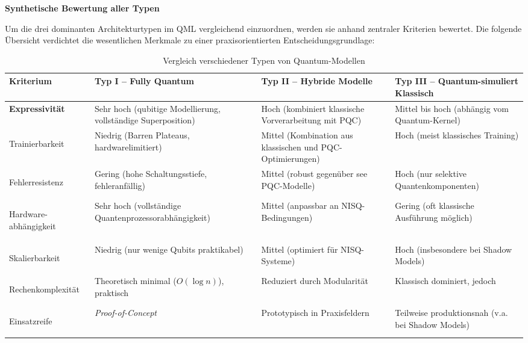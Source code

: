 \vspace{1.5em}
\noindent\textbf{Synthetische Bewertung aller Typen}

\noindent
Um die drei dominanten Architekturtypen im QML vergleichend einzuordnen, werden sie anhand zentraler Kriterien bewertet. Die folgende Übersicht verdichtet die wesentlichen Merkmale zu einer praxisorientierten Entscheidungsgrundlage:


\begin{table}[ht]
\centering
\small
\begin{tabular}{|>{\bfseries}m{2.5cm}|m{3cm}|m{3cm}|m{3cm}|}
\hline
Kriterium & Typ I – \textbf{Fully Quantum} & Typ II – \textbf{Hybride Modelle} & Typ III – \textbf{Quantum-simuliert Klassisch} \\
\hline

Expressivität & Sehr hoch (qubitige Modellierung, vollständige Superposition) & Hoch (kombiniert klassische Vorverarbeitung mit PQC) & Mittel bis hoch (abhängig vom Quantum-Kernel) \\
\hline

Trainierbarkeit & Niedrig (Barren Plateaus, hardwarelimitiert) & Mittel (Kombination aus klassischen und PQC-Optimierungen) & Hoch (meist klassisches Training) \\
\hline

Fehlerresistenz & Gering (hohe Schaltungsstiefe, fehleranfällig) & Mittel (robust gegenüber see PQC-Modelle) & Hoch (nur selektive Quantenkomponenten) \\
\hline

Hardware-
abhängigkeit & Sehr hoch (vollständige Quantenprozessorabhängigkeit) & Mittel (anpassbar an NISQ-Bedingungen) & Gering (oft klassische Ausführung möglich) \\
\hline

Skalierbarkeit & Niedrig (nur wenige Qubits praktikabel) & Mittel (optimiert für NISQ-Systeme) & Hoch (insbesondere bei Shadow Models) \\
\hline

Rechenkomplexität & Theoretisch minimal ($O(\log n)$), praktisch & Reduziert durch Modularität & Klassisch dominiert, jedoch \\
\hline

Einsatzreife & \textit{Proof-of-Concept} & Prototypisch in Praxisfeldern & Teilweise produktionsnah (v.a. bei Shadow Models) \\
\hline
\end{tabular}
\caption{Vergleich verschiedener Typen von Quantum-Modellen}
\end{table}


